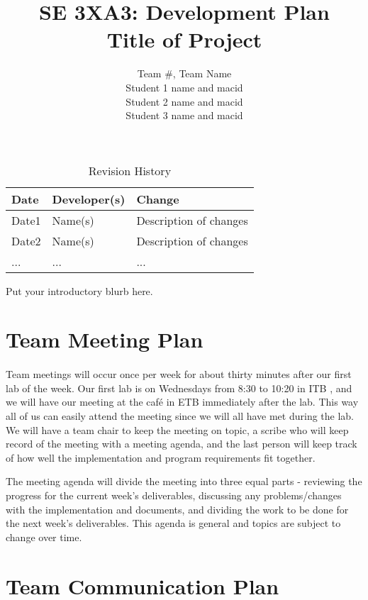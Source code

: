 \documentclass{article}
\title{SE 3XA3: Development Plan\\Title of Project}
\author{Team \#, Team Name
		\\ Student 1 name and macid
		\\ Student 2 name and macid
		\\ Student 3 name and macid
}
\date{}
\begin{document}
\begin{table}[hp]
\caption{Revision History} \label{TblRevisionHistory}
\begin{tabularx}{\textwidth}{llX}
\toprule
\textbf{Date} & \textbf{Developer(s)} & \textbf{Change}\\
\midrule
Date1 & Name(s) & Description of changes\\
Date2 & Name(s) & Description of changes\\
... & ... & ...\\
\bottomrule
\end{tabularx}
\end{table}

\newpage

\maketitle

Put your introductory blurb here.

\section{Team Meeting Plan}

\paragraph{}
Team meetings will occur once per week for about thirty minutes after our first lab of the week. Our first lab is on Wednesdays from 8:30 to 10:20 in ITB , and we will have our meeting at the café in ETB immediately after the lab. This way all of us can easily attend the meeting since we will all have met during the lab. We will have a team chair to keep the meeting on topic, a scribe who will keep record of the meeting with a meeting agenda, and the last person will keep track of how well the implementation and program requirements fit together.\par The meeting agenda will divide the meeting into three equal parts - reviewing the progress for the current week's deliverables, discussing any problems/changes with the implementation and documents, and dividing the work to be done for the next week's deliverables. This agenda is general and topics are subject to change over time.

\section{Team Communication Plan}
\end{document}
